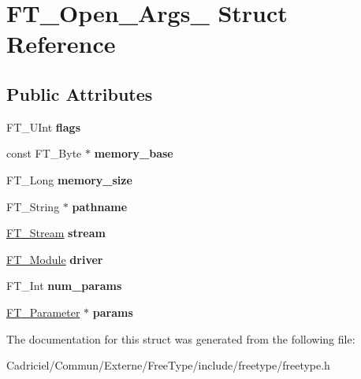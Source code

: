 \hypertarget{struct_f_t___open___args__}{\section{F\-T\-\_\-\-Open\-\_\-\-Args\-\_\- Struct Reference}
\label{struct_f_t___open___args__}
}
\subsection*{Public Attributes}
\begin{DoxyCompactItemize}
\item 
\hypertarget{struct_f_t___open___args___a2e3e6b9284fe8b4d9833e247a19181fa}{F\-T\-\_\-\-U\-Int {\bfseries flags}}\label{struct_f_t___open___args___a2e3e6b9284fe8b4d9833e247a19181fa}

\item 
\hypertarget{struct_f_t___open___args___a1231da51bc58922096b3bc603bb2ffb0}{const F\-T\-\_\-\-Byte $\ast$ {\bfseries memory\-\_\-base}}\label{struct_f_t___open___args___a1231da51bc58922096b3bc603bb2ffb0}

\item 
\hypertarget{struct_f_t___open___args___a87f0bb2f257abe94c93a79e0de3525da}{F\-T\-\_\-\-Long {\bfseries memory\-\_\-size}}\label{struct_f_t___open___args___a87f0bb2f257abe94c93a79e0de3525da}

\item 
\hypertarget{struct_f_t___open___args___aea3d454d9fd9bb7434aad07e651d027b}{F\-T\-\_\-\-String $\ast$ {\bfseries pathname}}\label{struct_f_t___open___args___aea3d454d9fd9bb7434aad07e651d027b}

\item 
\hypertarget{struct_f_t___open___args___ae1e6444bf0c21b323ce6cbe8bc475b2b}{\hyperlink{struct_f_t___stream_rec__}{F\-T\-\_\-\-Stream} {\bfseries stream}}\label{struct_f_t___open___args___ae1e6444bf0c21b323ce6cbe8bc475b2b}

\item 
\hypertarget{struct_f_t___open___args___a7c01bd7e34a440c3e89141ee521e2646}{\hyperlink{struct_f_t___module_rec__}{F\-T\-\_\-\-Module} {\bfseries driver}}\label{struct_f_t___open___args___a7c01bd7e34a440c3e89141ee521e2646}

\item 
\hypertarget{struct_f_t___open___args___afaf47d9e1631f2147b696fd7f5a6f4eb}{F\-T\-\_\-\-Int {\bfseries num\-\_\-params}}\label{struct_f_t___open___args___afaf47d9e1631f2147b696fd7f5a6f4eb}

\item 
\hypertarget{struct_f_t___open___args___a77b279a34beba29bc14901926f79818f}{\hyperlink{struct_f_t___parameter__}{F\-T\-\_\-\-Parameter} $\ast$ {\bfseries params}}\label{struct_f_t___open___args___a77b279a34beba29bc14901926f79818f}

\end{DoxyCompactItemize}


The documentation for this struct was generated from the following file\-:\begin{DoxyCompactItemize}
\item 
Cadriciel/\-Commun/\-Externe/\-Free\-Type/include/freetype/freetype.\-h\end{DoxyCompactItemize}
